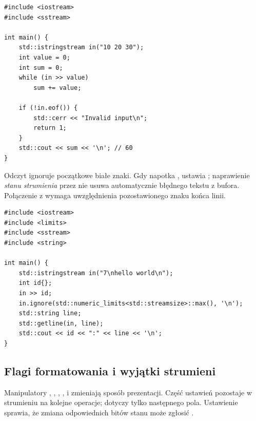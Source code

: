 \begin{lstlisting}[caption={Odczyt liczb i kontrola bledu formatu (kompletny program, C++20).}]
#include <iostream>
#include <sstream>

int main() {
    std::istringstream in("10 20 30");
    int value = 0;
    int sum = 0;
    while (in >> value)
        sum += value;

    if (!in.eof()) {
        std::cerr << "Invalid input\n";
        return 1;
    }
    std::cout << sum << '\n'; // 60
}
\end{lstlisting}

Odczyt  ignoruje początkowe białe znaki. Gdy napotka
, ustawia ; naprawienie \emph{stanu strumienia}
przez  nie usuwa automatycznie błędnego tekstu z bufora.
Połączenie \code{>>} z  wymaga uwzględnienia pozostawionego
znaku końca linii.

\begin{lstlisting}[caption={Liczba, a potem pelna linia (kompletny program).}]
#include <iostream>
#include <limits>
#include <sstream>
#include <string>

int main() {
    std::istringstream in("7\nhello world\n");
    int id{};
    in >> id;
    in.ignore(std::numeric_limits<std::streamsize>::max(), '\n');
    std::string line;
    std::getline(in, line);
    std::cout << id << ":" << line << '\n';
}
\end{lstlisting}

\subsection{Flagi formatowania i wyjątki strumieni}

Manipulatory , ,
, ,  i
 zmieniają sposób prezentacji. Część ustawień
pozostaje w strumieniu na kolejne operacje;  dotyczy tylko
następnego pola. Ustawienie  sprawia, że zmiana
odpowiednich bitów stanu może zgłosić .

